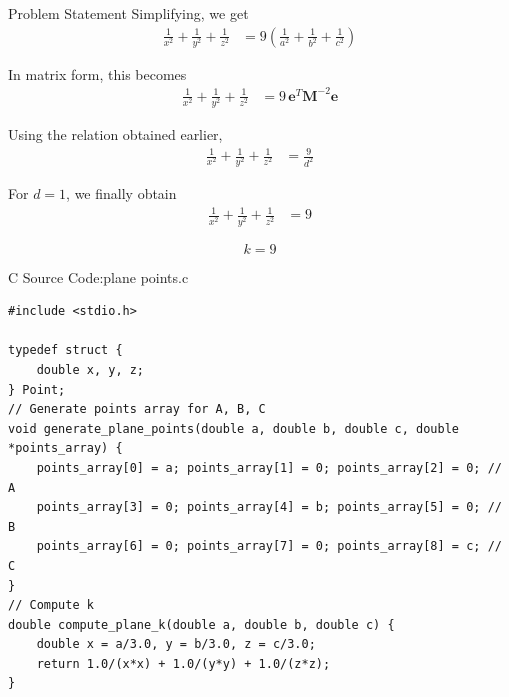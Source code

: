 \documentclass{beamer}
\numberwithin{equation}{section}
\providecommand{\brak}[1]{\ensuremath{\left(#1\right)}}
\theoremstyle{remark}
\let\vec\mathbf
\begin{document}
\begin{frame}{Problem Statement}
Simplifying, we get
\begin{align}
\frac{1}{x^2} + \frac{1}{y^2} + \frac{1}{z^2}
&= 9\brak{\frac{1}{a^2} + \frac{1}{b^2} + \frac{1}{c^2}}
\end{align}

In matrix form, this becomes
\begin{align}
\frac{1}{x^2} + \frac{1}{y^2} + \frac{1}{z^2}
&= 9\, \vec{e}^T \vec{M}^{-2} \vec{e}
\end{align}

Using the relation obtained earlier,
\begin{align}
\frac{1}{x^2} + \frac{1}{y^2} + \frac{1}{z^2}
&= \frac{9}{d^2}
\end{align}

For $d=1$, we finally obtain
\begin{align}
\frac{1}{x^2} + \frac{1}{y^2} + \frac{1}{z^2} &= 9
\end{align}

\[
\boxed{k=9}
\]


\end{frame}

\begin{frame}[fragile]{C Source Code:plane points.c}
\begin{verbatim}
#include <stdio.h>

typedef struct {
    double x, y, z;
} Point;
// Generate points array for A, B, C
void generate_plane_points(double a, double b, double c, double *points_array) {
    points_array[0] = a; points_array[1] = 0; points_array[2] = 0; // A
    points_array[3] = 0; points_array[4] = b; points_array[5] = 0; // B
    points_array[6] = 0; points_array[7] = 0; points_array[8] = c; // C
}
// Compute k
double compute_plane_k(double a, double b, double c) {
    double x = a/3.0, y = b/3.0, z = c/3.0;
    return 1.0/(x*x) + 1.0/(y*y) + 1.0/(z*z);
}


\end{verbatim}
\end{frame}
\end{document}

